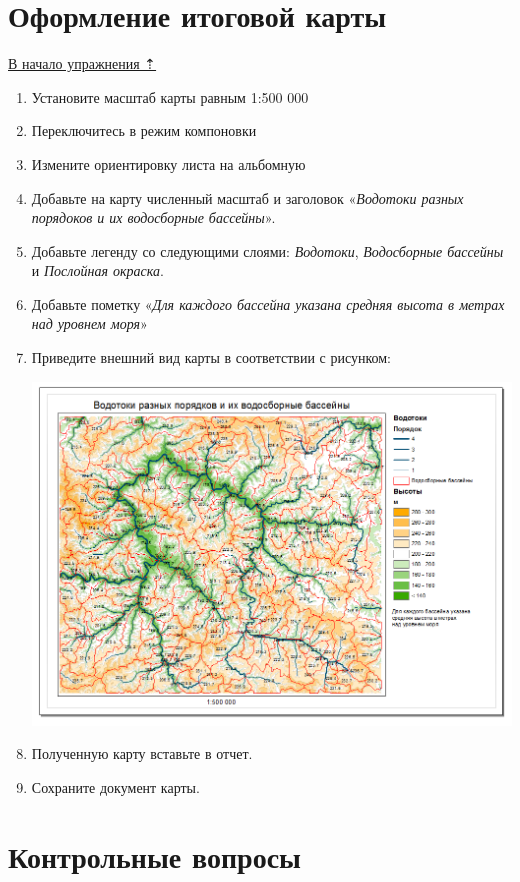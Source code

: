 \documentclass[12pt,]{book}
\begin{document}
\hypertarget{dem-result}{%
\section{Оформление итоговой карты}\label{dem-result}}

\protect\hyperlink{dem}{В начало упражнения ⇡}

\begin{enumerate}
\def\labelenumi{\arabic{enumi}.}
\item
  Установите масштаб карты равным 1:500 000
\item
  Переключитесь в режим компоновки
\item
  Измените ориентировку листа на альбомную
\item
  Добавьте на карту численный масштаб и заголовок «\emph{Водотоки разных порядоков и их водосборные бассейны}».
\item
  Добавьте легенду со следующими слоями: \emph{Водотоки}, \emph{Водосборные бассейны} и \emph{Послойная окраска}.
\item
  Добавьте пометку «\emph{Для каждого бассейна указана средняя высота в метрах над уровнем моря}»
\item
  Приведите внешний вид карты в соответствии с рисунком:

  \includegraphics{images/Ex15/image32.png}
\item
  Полученную карту вставьте в отчет.
\item
  Сохраните документ карты.
\end{enumerate}

\hypertarget{dem-questions}{%
\section{Контрольные вопросы}\label{dem-questions}}
\end{document}
